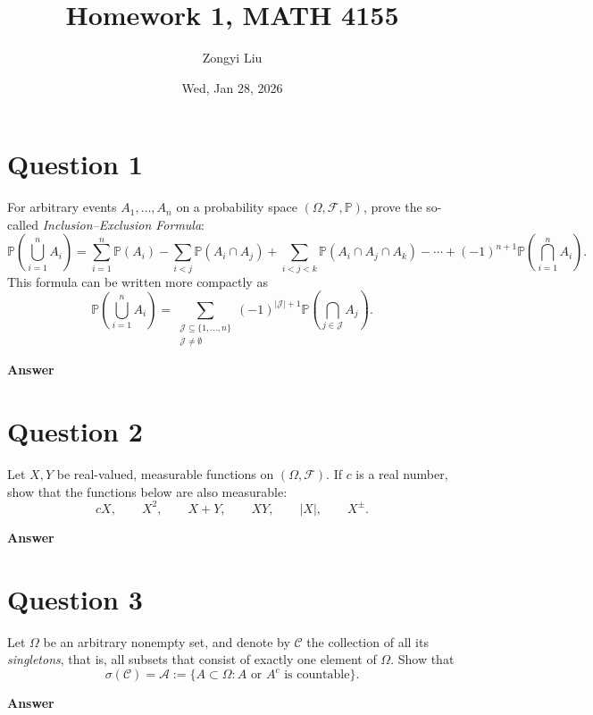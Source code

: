 \documentclass[letterpaper]{article}
\title{Homework 1, MATH 4155}
\author{Zongyi Liu}
\date{Wed, Jan 28, 2026}
\begin{document}
		\maketitle
		
		\section{Question 1}
		
		For arbitrary events $A_1,\dots,A_n$ on a probability space $(\Omega,\mathcal{F},\mathbb{P})$, prove the so-called \emph{Inclusion--Exclusion Formula}:
		\[
		\mathbb{P}\!\left( \bigcup_{i=1}^n A_i \right)
		= \sum_{i=1}^n \mathbb{P}(A_i)
		- \sum_{i<j} \mathbb{P}(A_i \cap A_j)
		+ \sum_{i<j<k} \mathbb{P}(A_i \cap A_j \cap A_k)
		- \cdots
		+ (-1)^{n+1} \mathbb{P}\!\left( \bigcap_{i=1}^n A_i \right).
		\]
		This formula can be written more compactly as
		\[
		\mathbb{P}\!\left( \bigcup_{i=1}^n A_i \right)
		=
		\sum_{\substack{\mathcal{J} \subseteq \{1,\dots,n\} \\ \mathcal{J} \neq \emptyset}}
		(-1)^{|\mathcal{J}|+1}
		\mathbb{P}\!\left( \bigcap_{j \in \mathcal{J}} A_j \right).
		\]
		
		\textbf{Answer}
		
		\clearpage
		
	
	\section{Question 2}
	
	Let $X,Y$ be real-valued, measurable functions on $(\Omega,\mathcal{F})$.
	If $c$ is a real number, show that the functions below are also measurable:
	\[
	cX, \qquad X^2, \qquad X+Y, \qquad XY, \qquad |X|, \qquad X^{\pm}.
	\]
		
		\textbf{Answer}
		
		\clearpage
		
		\section{Question 3}
		
		Let $\Omega$ be an arbitrary nonempty set, and denote by $\mathcal{C}$ the
		collection of all its \emph{singletons}, that is, all subsets that consist of
		exactly one element of $\Omega$. Show that
		\[
		\sigma(\mathcal{C}) = \mathcal{A}
		:= \bigl\{ A \subset \Omega : A \text{ or } A^c \text{ is countable} \bigr\}.
		\]
		
		
		\textbf{Answer}
		
\end{document}
